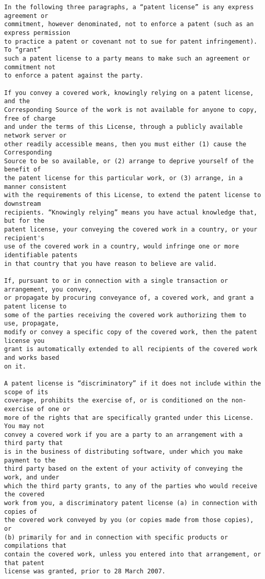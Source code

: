 \begin{verbatim}
In the following three paragraphs, a “patent license” is any express agreement or
commitment, however denominated, not to enforce a patent (such as an express permission
to practice a patent or covenant not to sue for patent infringement). To “grant”
such a patent license to a party means to make such an agreement or commitment not
to enforce a patent against the party.

If you convey a covered work, knowingly relying on a patent license, and the
Corresponding Source of the work is not available for anyone to copy, free of charge
and under the terms of this License, through a publicly available network server or
other readily accessible means, then you must either (1) cause the Corresponding
Source to be so available, or (2) arrange to deprive yourself of the benefit of
the patent license for this particular work, or (3) arrange, in a manner consistent
with the requirements of this License, to extend the patent license to downstream
recipients. “Knowingly relying” means you have actual knowledge that, but for the
patent license, your conveying the covered work in a country, or your recipient's
use of the covered work in a country, would infringe one or more identifiable patents
in that country that you have reason to believe are valid.

If, pursuant to or in connection with a single transaction or arrangement, you convey,
or propagate by procuring conveyance of, a covered work, and grant a patent license to
some of the parties receiving the covered work authorizing them to use, propagate,
modify or convey a specific copy of the covered work, then the patent license you
grant is automatically extended to all recipients of the covered work and works based
on it.

A patent license is “discriminatory” if it does not include within the scope of its
coverage, prohibits the exercise of, or is conditioned on the non-exercise of one or
more of the rights that are specifically granted under this License. You may not
convey a covered work if you are a party to an arrangement with a third party that
is in the business of distributing software, under which you make payment to the
third party based on the extent of your activity of conveying the work, and under
which the third party grants, to any of the parties who would receive the covered
work from you, a discriminatory patent license (a) in connection with copies of
the covered work conveyed by you (or copies made from those copies), or
(b) primarily for and in connection with specific products or compilations that
contain the covered work, unless you entered into that arrangement, or that patent
license was granted, prior to 28 March 2007.


\end{verbatim}
